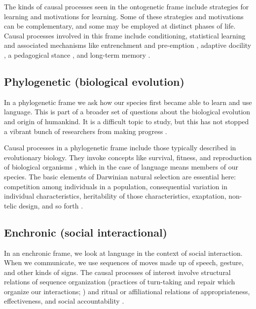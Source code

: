 The kinds of causal processes seen in the ontogenetic frame include strategies 
for learning and motivations for learning. Some of these strategies and 
motivations can be complementary, and some may be employed at distinct 
phases of life. Causal processes involved in this frame include 
conditioning, statistical learning and associated mechanisms like 
entrenchment and pre-emption \citep{tomasello_constructing_2003}, adaptive docility \citep{simon_mechanism_1990}, a pedagogical stance \citep{gergely_sylvias_2006}, and long-term 
memory \citep{kandel2009biology}.



\subsection{Phylogenetic (biological evolution)}


In a phylogenetic frame we ask how our species first became able to learn and use language. This is part of a broader set of questions about the 
biological evolution and origin of humankind. It is a difficult topic to 
study, but this has not stopped a vibrant bunch of researchers from 
making progress \citep{hurford_origins_2007,hurford_origins_2012,levinson_language_2014}. 



Causal processes in a phylogenetic frame include those typically described in evolutionary biology. They invoke 
concepts like survival, fitness, and reproduction of biological 
organisms \citep{ridley_evolution_1997,ridley_evolution_2004}, which in the case of language means 
members of our species. The basic elements of 
Darwinian natural selection are essential here: competition among individuals in a 
population, consequential variation in individual characteristics, 
heritability of those characteristics, exaptation, non-telic design, and so forth \citep{darwin_origin_1859,dawkins_selfish_1976,jacob_evolution_1977,mayr_growth_1982}.



\subsection{Enchronic (social interactional)}


In an enchronic frame, we look at language in the context of social interaction. When we communicate, we use sequences of moves made up of speech, gesture, and other kinds of signs. The causal processes of interest involve structural relations of sequence 
organization (practices of turn-taking and repair which organize our 
interactions; \citealt{schegloff_sequencing_1968,schegloff_sequence_2007,sacks_simplest_1974,schegloff_preference_1977,sidnell_handbook_2012}) and ritual or affiliational relations of 
appropriateness, effectiveness, and social accountability \citep{heritage_garfinkel_1984,atkinson_structures_1984,stivers_morality_2011,enfield_relationship_2013}. 



